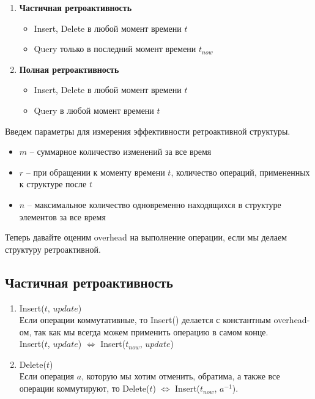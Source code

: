 \begin{enumerate}

\item {\bf Частичная ретроактивность}

\begin{itemize}

\item Insert, Delete в любой момент времени $t$
\item Query только в последний момент времени $t_{now}$

\end{itemize}

\item {\bf Полная ретроактивность}

\begin{itemize}

\item Insert, Delete в любой момент времени $t$
\item Query в любой момент времени $t$

\end{itemize}

\end{enumerate}

Введем параметры для измерения эффективности ретроактивной структуры.

\begin{itemize}

\item $m$ -- суммарное количество изменений за все время
\item $r$ -- при обращении к моменту времени $t$, количество операций, примененных к структуре после $t$
\item $n$ -- максимальное количество одновременно находящихся в структуре элементов за все время

\end{itemize}

Теперь давайте оценим overhead на выполнение операции, если мы делаем структуру ретроактивной.

\subsection*{Частичная ретроактивность}

\begin{enumerate}

\item Insert($t$, $update$)\\ 
Если операции коммутативные, то Insert() делается с константным overhead-ом, так как мы всегда можем применить операцию в самом конце.\\
Insert($t$, $update$) $\Leftrightarrow$ Insert($t_{now}$, $update$)

\item Delete($t$)\\
Если операция $a$, которую мы хотим отменить, обратима, а также все операции коммутируют, то Delete($t$) $\Leftrightarrow$ Insert($t_{now}$, $a^{-1}$).

\end{enumerate}


